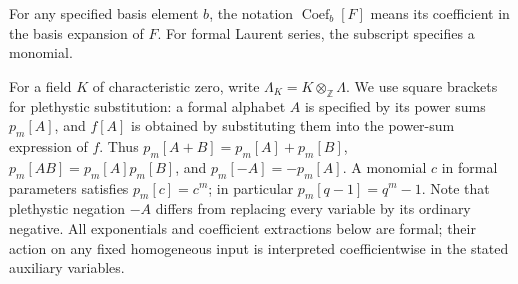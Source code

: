 \documentclass[12pt,reqno,a4paper]{amsart}
\numberwithin{equation}{section}
\numberwithin{figure}{section}
\theoremstyle{plain}
\theoremstyle{definition}
\DeclareMathOperator{\Coef}{Coef}
\begin{document}
For any specified basis element $b$, the
notation $\Coef_b[F]$ means its coefficient in the basis expansion of $F$.
For formal Laurent series, the subscript specifies a monomial.

For a field $K$ of characteristic zero, write
$\Lambda_K=K\otimes_{\mathbb Z}\Lambda$.
We use square brackets for plethystic substitution: a formal alphabet
$A$ is specified by its power sums $p_m[A]$, and $f[A]$ is obtained
by substituting them into the power-sum expression of $f$.
Thus $p_m[A+B]=p_m[A]+p_m[B]$,
$p_m[AB]=p_m[A]p_m[B]$, and $p_m[-A]=-p_m[A]$.
A monomial $c$ in formal parameters satisfies $p_m[c]=c^m$;
in particular $p_m[q-1]=q^m-1$.  Note that plethystic negation $-A$
differs from replacing every variable by its ordinary negative.
All exponentials and coefficient extractions below are formal;
their action on any fixed homogeneous input is interpreted
coefficientwise in the stated auxiliary variables.
\end{document}
